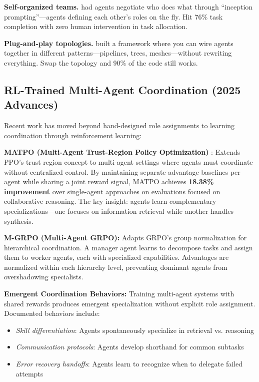 \documentclass[12pt,a4paper]{report}
\theoremstyle{definition}
\begin{document}
\textbf{Self-organized teams.} \citet{li2023camel} had agents negotiate who does what through ``inception prompting''---agents defining each other's roles on the fly. Hit 76\% task completion with zero human intervention in task allocation.

\textbf{Plug-and-play topologies.} \citet{wu2023autogen} built a framework where you can wire agents together in different patterns---pipelines, trees, meshes---without rewriting everything. Swap the topology and 90\% of the code still works.

\subsection{RL-Trained Multi-Agent Coordination (2025 Advances)}
\label{sec:multi_agent_rl}

Recent work has moved beyond hand-designed role assignments to learning coordination through reinforcement learning:

\textbf{MATPO (Multi-Agent Trust-Region Policy Optimization)} \cite{mo2025matpo}: Extends PPO's trust region concept to multi-agent settings where agents must coordinate without centralized control. By maintaining separate advantage baselines per agent while sharing a joint reward signal, MATPO achieves \textbf{18.38\% improvement} over single-agent approaches on evaluations focused on collaborative reasoning.
 The key insight: agents learn complementary specializations---one focuses on information retrieval while another handles synthesis.

\textbf{M-GRPO (Multi-Agent GRPO):} Adapts GRPO's group normalization for hierarchical coordination. A manager agent learns to decompose tasks and assign them to worker agents, each with specialized capabilities. Advantages are normalized within each hierarchy level, preventing dominant agents from overshadowing specialists.

\textbf{Emergent Coordination Behaviors:} Training multi-agent systems with shared rewards produces emergent specialization without explicit role assignment. Documented behaviors include:
\begin{itemize}
    \item \textit{Skill differentiation}: Agents spontaneously specialize in retrieval vs. reasoning
    \item \textit{Communication protocols}: Agents develop shorthand for common subtasks
    \item \textit{Error recovery handoffs}: Agents learn to recognize when to delegate failed attempts
\end{itemize}
\end{document}
